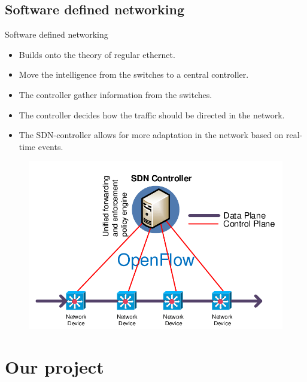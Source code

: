 \documentclass{beamer}
\begin{document}
\subsection{Software defined networking}
\begin{frame}{Software defined networking}
    \begin{itemize}
        \item Builds onto the theory of regular ethernet.
        \item Move the intelligence from the switches to a central controller.
        \item The controller gather information from the switches.
        \item The controller decides how the traffic should be directed in the network.
        \item The SDN-controller allows for more adaptation in the network based on real-time events.
    \end{itemize}
    \begin{figure}
        \includegraphics[width=0.55\linewidth]{sdn_info.png}
    \end{figure}
\end{frame}


\section{Our project}
\end{document}
